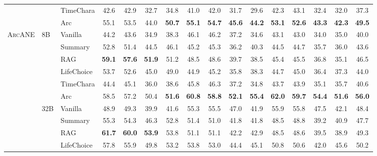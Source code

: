 \documentclass[11pt]{article}
\newcommand{\ours}{\textsc{ArcANE}}
\begin{document}
\begin{table}[t]
\begin{tabular}{lllccccccccccccc}
 &  & TimeChara & 42.6 & 42.9 & 32.7 & 34.8 & 41.0 & 42.0 & 31.7 & 29.6 & 42.3 & 43.1 & 32.4 & 32.0 & 37.3 \\
 &  & \cellcolor{yellow!15} Arc & \cellcolor{yellow!15} 55.1 & \cellcolor{yellow!15} 53.5 & \cellcolor{yellow!15} 44.0 & \cellcolor{yellow!15} \textbf{50.7} & \cellcolor{yellow!15} \textbf{55.1} & \cellcolor{yellow!15} \textbf{54.7} & \cellcolor{yellow!15} \textbf{45.6} & \cellcolor{yellow!15} \textbf{44.2} & \cellcolor{yellow!15} \textbf{53.1} & \cellcolor{yellow!15} \textbf{52.6} & \cellcolor{yellow!15} \textbf{43.3} & \cellcolor{yellow!15} \textbf{42.3} & \cellcolor{yellow!15} \textbf{49.5} \\
\midrule
\multirow[t]{12}{*}{\ours{}} & \multirow[t]{6}{*}{8B} & Vanilla & 44.2 & 43.6 & 34.9 & 38.3 & 46.1 & 46.2 & 37.2 & 34.6 & 43.1 & 43.0 & 34.0 & 35.0 & 40.0 \\
 &  & Summary & 52.8 & 51.4 & 44.5 & 46.1 & 45.2 & 45.3 & 36.2 & 40.3 & 44.5 & 44.7 & 35.7 & 36.0 & 43.6 \\
 &  & RAG & \textbf{59.1} & \textbf{57.6} & \textbf{51.9} & 51.2 & 48.5 & 48.6 & 39.7 & 38.5 & 45.4 & 45.5 & 36.8 & 35.1 & 46.5 \\
 &  & LifeChoice & 53.7 & 52.6 & 45.0 & 49.0 & 44.9 & 45.2 & 35.8 & 38.3 & 44.7 & 45.0 & 36.4 & 37.3 & 44.0 \\
 &  & TimeChara & 44.4 & 45.1 & 36.0 & 38.6 & 45.8 & 46.3 & 37.2 & 34.8 & 43.7 & 43.9 & 35.1 & 35.7 & 40.6 \\
 &  & \cellcolor{yellow!15} Arc & \cellcolor{yellow!15} 58.5 & \cellcolor{yellow!15} 57.2 & \cellcolor{yellow!15} 50.4 & \cellcolor{yellow!15} \textbf{51.6} & \cellcolor{yellow!15} \textbf{60.8} & \cellcolor{yellow!15} \textbf{58.8} & \cellcolor{yellow!15} \textbf{52.1} & \cellcolor{yellow!15} \textbf{55.4} & \cellcolor{yellow!15} \textbf{62.0} & \cellcolor{yellow!15} \textbf{59.7} & \cellcolor{yellow!15} \textbf{54.4} & \cellcolor{yellow!15} \textbf{51.6} & \cellcolor{yellow!15} \textbf{56.0} \\
\cmidrule(l){2-16}
 & \multirow[t]{6}{*}{32B} & Vanilla & 48.9 & 49.3 & 39.9 & 41.6 & 55.3 & 55.5 & 47.0 & 41.9 & 55.9 & 55.8 & 47.5 & 42.1 & 48.4 \\
 &  & Summary & 55.3 & 54.3 & 46.3 & 52.8 & 51.4 & 51.0 & 41.8 & 41.8 & 48.5 & 48.8 & 39.2 & 40.9 & 47.7 \\
 &  & RAG & \textbf{61.7} & \textbf{60.0} & \textbf{53.9} & 53.8 & 51.1 & 51.1 & 42.2 & 42.9 & 48.5 & 48.6 & 39.5 & 38.9 & 49.3 \\
 &  & LifeChoice & 57.8 & 55.9 & 49.8 & 53.2 & 53.8 & 53.0 & 44.4 & 45.1 & 50.8 & 50.6 & 42.0 & 45.6 & 50.2 \\

\end{tabular}
\end{table}
\end{document}
